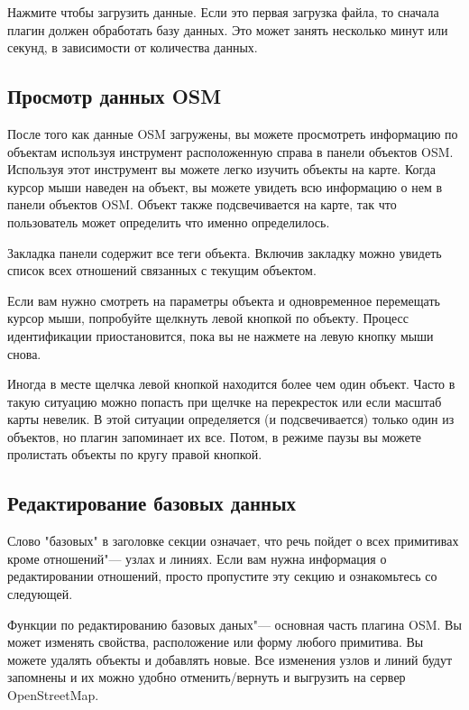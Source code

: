 Нажмите  чтобы загрузить данные. Если это первая загрузка
файла, то сначала плагин должен обработать базу данных. Это может занять
несколько минут или секунд, в зависимости от количества данных.

\subsection{Просмотр данных OSM}

После того как данные OSM загружены, вы можете просмотреть информацию по
объектам используя инструмент 
расположенную справа в панели объектов OSM. Используя этот инструмент вы
можете легко изучить объекты на карте. Когда курсор мыши наведен на
объект, вы можете увидеть всю информацию о нем в панели объектов OSM.
Объект также подсвечивается на карте, так что пользователь может
определить что именно определилось.

Закладка  панели содержит все теги объекта. Включив
закладку  можно увидеть список всех отношений связанных
с текущим объектом.

Если вам нужно смотреть на параметры объекта и одновременное перемещать
курсор мыши, попробуйте щелкнуть левой кнопкой по объекту. Процесс
идентификации приостановится, пока вы не нажмете на левую кнопку мыши
снова.

Иногда в месте щелчка левой кнопкой находится более чем один объект.
Часто в такую ситуацию можно попасть при щелчке на перекресток или если
масштаб карты невелик. В этой ситуации определяется (и подсвечивается)
только один из объектов, но плагин запоминает их все. Потом, в режиме
паузы вы можете пролистать объекты по кругу правой кнопкой.

\subsection{Редактирование базовых данных}

Слово "базовых" в заголовке секции означает, что речь пойдет о всех
примитивах кроме отношений"--- узлах и линиях. Если вам нужна информация
о редактировании отношений, просто пропустите эту секцию и ознакомьтесь
со следующей.

Функции по редактированию базовых даных"--- основная часть плагина OSM.
Вы может изменять свойства, расположение или форму любого примитива. Вы
можете удалять объекты и добавлять новые. Все изменения узлов и линий
будут запомнены и их можно удобно отменить/вернуть и выгрузить на сервер
OpenStreetMap.

